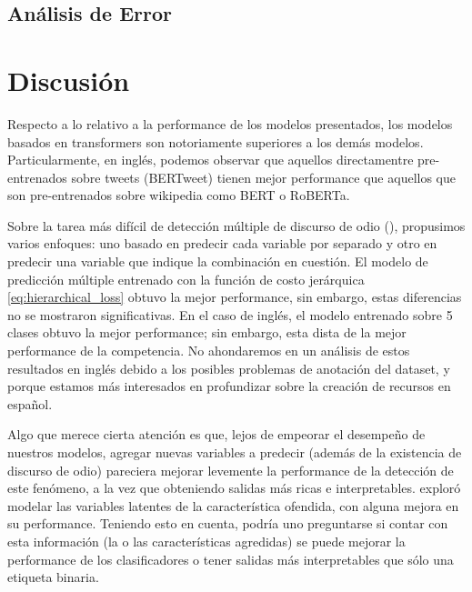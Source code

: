 \subsection{Análisis de Error}
\label{sec:hateval_error_analysis}




\section{Discusión}

Respecto a lo relativo a la performance de los modelos presentados, los modelos basados en transformers son notoriamente superiores a los demás modelos. Particularmente, en inglés, podemos observar que aquellos directamentre pre-entrenados sobre tweets (BERTweet) tienen mejor performance que aquellos que son pre-entrenados sobre wikipedia como BERT o RoBERTa.

Sobre la tarea más difícil de detección múltiple de discurso de odio (\subtaskb{}), propusimos varios enfoques: uno basado en predecir cada variable por separado y otro en predecir una variable que indique la combinación en cuestión. El modelo de predicción múltiple entrenado con la función de costo jerárquica \ref{eq:hierarchical_loss} obtuvo la mejor performance, sin embargo, estas diferencias no se mostraron significativas. En el caso de inglés, el modelo entrenado sobre 5 clases obtuvo la mejor performance; sin embargo, esta dista de la mejor performance de la competencia. No ahondaremos en un análisis de estos resultados en inglés debido a los posibles problemas de anotación del dataset, y porque estamos más interesados en profundizar sobre la creación de recursos en español.

Algo que merece cierta atención es que, lejos de empeorar el desempeño de nuestros modelos, agregar nuevas variables a predecir (además de la existencia de discurso de odio) pareciera mejorar levemente la performance de la detección de este fenómeno, a la vez que obteniendo salidas más ricas e interpretables. \citet{gertner-etal-2019-mitre} exploró modelar las variables latentes de la característica ofendida, con alguna mejora en su performance. Teniendo esto en cuenta, podría uno preguntarse si contar con esta información (la o las características agredidas) se puede mejorar la performance de los clasificadores o tener salidas más interpretables que sólo una etiqueta binaria.

